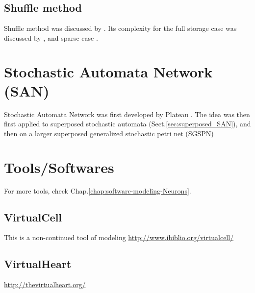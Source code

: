 \subsection{Shuffle method}
\label{sec:shuffle_method}

Shuffle method was discussed by \citep{davio1981}. Its complexity for the full
storage case was discussed by \citep{steward1994}, and sparse case
\citep{buchholz2000}. 


\section{Stochastic Automata Network (SAN)}
\label{sec:SAN}

Stochastic Automata Network was first developed by Plateau
\citep{plateau1985,plateau1991}.  The idea was then first applied to superposed
stochastic automata (Sect.\ref{sec:superposed_SAN}), and then on a larger
superposed generalized stochastic petri net (SGSPN) 


\section{Tools/Softwares}

For more tools, check Chap.\ref{chap:software-modeling-Neurons}.

\subsection{VirtualCell}
\label{sec:VirtualCell-Tour}

This is a non-continued tool of modeling
\url{http://www.ibiblio.org/virtualcell/}

\subsection{VirtualHeart}

\url{http://thevirtualheart.org/}

